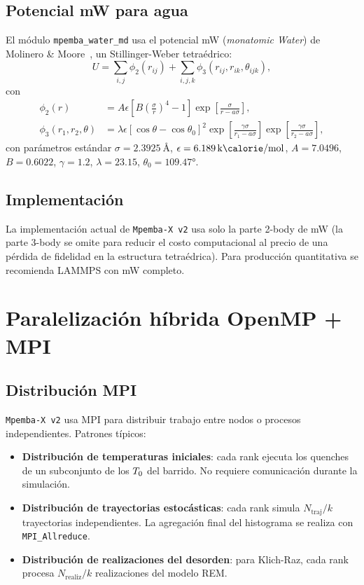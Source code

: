 \subsection{Potencial mW para agua}

El módulo \texttt{mpemba\_water\_md} usa el potencial mW (\emph{monatomic 
Water}) de Molinero \& Moore~\cite{molinero2009}, un Stillinger-Weber tetraédrico:
\begin{equation}
    U = \sum_{i,j} \phi_2(r_{ij}) + \sum_{i,j,k} \phi_3(r_{ij}, r_{ik}, \theta_{ijk}),
\end{equation}
%
con
\begin{align}
    \phi_2(r) &= A \epsilon \left[B \left(\frac{\sigma}{r}\right)^4 - 1\right] \exp\!\left[\frac{\sigma}{r - a \sigma}\right], \\
    \phi_3(r_1, r_2, \theta) &= \lambda \epsilon \left[\cos\theta - \cos\theta_0\right]^2 
    \exp\!\left[\frac{\gamma \sigma}{r_1 - a \sigma}\right] \exp\!\left[\frac{\gamma \sigma}{r_2 - a \sigma}\right],
\end{align}
%
con parámetros estándar $\sigma = \SI{2.3925}{\angstrom}$, 
$\epsilon = \SI{6.189}{\kilo\calorie\per\mole}$, $A = 7.0496$, $B = 0.6022$, 
$\gamma = 1.2$, $\lambda = 23.15$, $\theta_0 = 109.47°$.

\subsection{Implementación}

La implementación actual de \texttt{Mpemba-X v2} usa solo la parte 2-body de 
mW (la parte 3-body se omite para reducir el costo computacional al precio 
de una pérdida de fidelidad en la estructura tetraédrica). Para producción 
quantitativa se recomienda LAMMPS con mW completo.

\section{Paralelización híbrida OpenMP + MPI}

\subsection{Distribución MPI}

\texttt{Mpemba-X v2} usa MPI para distribuir trabajo entre nodos o procesos 
independientes. Patrones típicos:

\begin{itemize}
\item \textbf{Distribución de temperaturas iniciales}: cada rank ejecuta los 
quenches de un subconjunto de los $T_{0}$ del barrido. No requiere 
comunicación durante la simulación.
\item \textbf{Distribución de trayectorias estocásticas}: cada rank simula 
$N_{\mathrm{traj}}/k$ trayectorias independientes. La agregación final del 
histograma se realiza con \texttt{MPI\_Allreduce}.
\item \textbf{Distribución de realizaciones del desorden}: para Klich-Raz, 
cada rank procesa $N_{\mathrm{realiz}}/k$ realizaciones del modelo REM.
\end{itemize}

